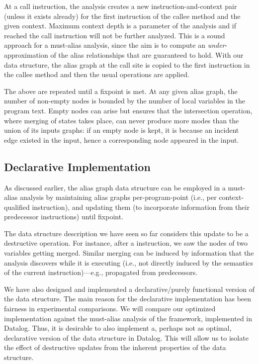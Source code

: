 At a call instruction, the analysis creates a new instruction-and-context pair (unless it exists already) for the first instruction of the callee method and the given context. Maximum context depth is a parameter of the analysis and if reached the call instruction will not be further analyzed. This is a sound approach for a must-alias analysis, since the aim is to compute an \emph{under}-approximation of the alias relationships that are guaranteed to hold. With our data structure, the alias graph at the call site is copied to the first instruction in the callee method and then the usual operations are applied.

The above are repeated until a fixpoint is met. At any given alias graph, the number of non-empty nodes is bounded by the number of local variables in the program text. Empty nodes can arise but  ensures that the intersection operation, where merging of states takes place, can never produce more modes than the union of its inputs graphs: if an empty node is kept, it is because an incident edge existed in the input, hence a corresponding node appeared in the input.


\subsection{Declarative Implementation}

As discussed earlier, the alias graph data structure can be employed in a must-alias analysis by maintaining alias graphs per-program-point (i.e., per context-qualified instruction), and updating them (to incorporate information from their predecessor instructions) until fixpoint.

The data structure description we have seen so far considers this update to be a destructive operation. For instance, after a  instruction, we saw the nodes of two variables getting merged. Similar merging can be induced by information that the analysis discovers while it is executing (i.e., not directly induced by the semantics of the current instruction)---e.g., propagated from predecessors.

We have also designed and implemented a declarative/purely functional version of the data structure. The main reason for the declarative implementation has been fairness in experimental comparisons. We will compare our optimized implementation against the must-alias analysis of the \doop{} framework, implemented in Datalog. Thus, it is desirable to also implement a, perhaps not as optimal, declarative version of the data structure in Datalog. This will allow us to isolate the effect of destructive updates from the inherent properties of the data structure.

